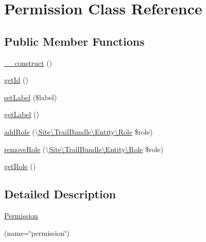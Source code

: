 \hypertarget{class_site_1_1_trail_bundle_1_1_entity_1_1_permission}{}\section{Permission Class Reference}
\label{class_site_1_1_trail_bundle_1_1_entity_1_1_permission}
\subsection*{Public Member Functions}
\begin{DoxyCompactItemize}
\item 
\hyperlink{class_site_1_1_trail_bundle_1_1_entity_1_1_permission_a095c5d389db211932136b53f25f39685}{\+\_\+\+\_\+construct} ()
\item 
\hyperlink{class_site_1_1_trail_bundle_1_1_entity_1_1_permission_a12251d0c022e9e21c137a105ff683f13}{get\+Id} ()
\item 
\hyperlink{class_site_1_1_trail_bundle_1_1_entity_1_1_permission_aff9dc1c7a22e2b4168647651480e586a}{set\+Label} (\$label)
\item 
\hyperlink{class_site_1_1_trail_bundle_1_1_entity_1_1_permission_a14c4e7420d903d3e40342266333d2ecf}{get\+Label} ()
\item 
\hyperlink{class_site_1_1_trail_bundle_1_1_entity_1_1_permission_a1c2c6679727f4706c1b78d71115327b7}{add\+Role} (\textbackslash{}\hyperlink{class_site_1_1_trail_bundle_1_1_entity_1_1_role}{Site\textbackslash{}\+Trail\+Bundle\textbackslash{}\+Entity\textbackslash{}\+Role} \$role)
\item 
\hyperlink{class_site_1_1_trail_bundle_1_1_entity_1_1_permission_a4b6089f9f4df3125d5781d6329b67544}{remove\+Role} (\textbackslash{}\hyperlink{class_site_1_1_trail_bundle_1_1_entity_1_1_role}{Site\textbackslash{}\+Trail\+Bundle\textbackslash{}\+Entity\textbackslash{}\+Role} \$role)
\item 
\hyperlink{class_site_1_1_trail_bundle_1_1_entity_1_1_permission_a0b2e7098f1c48a7439a42bada5b69689}{get\+Role} ()
\end{DoxyCompactItemize}


\subsection{Detailed Description}
\hyperlink{class_site_1_1_trail_bundle_1_1_entity_1_1_permission}{Permission}

(name=\char`\"{}permission\char`\"{})  

